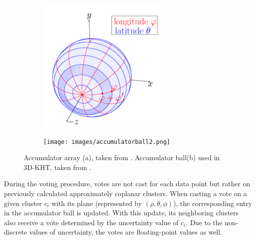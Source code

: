\documentclass[main.tex]{subfiles}
\begin{document}
\begin{figure}[H]
    \centering
    \hspace{\fill}
    \begin{subfigure}{0.4\textwidth}
        \centering
        \includegraphics[width=\textwidth]{images/accumulatorarray.png}
        \caption[3D-KHT Accumulator Ball]{}
        \label{fig:accarr}
    \end{subfigure}
    \hspace{\fill}
    \begin{subfigure}{0.4\textwidth}
        \centering
        \texttt{[image: images/accumulatorball2.png]}
        \caption[3D-KHT Accumulator Ball]{}
        \label{fig:accball}
    \end{subfigure}
    \hspace{\fill}
    \caption[Hough Transform Accumulators]{Accumulator array (a), taken from \cite*[Figure~3]{Borrmann_Elseberg_Lingemann_Nüchter_2011}. Accumulator 
    ball(b) used in 3D-KHT, taken from \cite*[Figure~5]{Limberger_Oliveira_2015}.}
\end{figure}

During the voting procedure, votes are not cast for each data point but rather on previously calculated approximately coplanar clusters.
When casting a vote on a given cluster $c_i$ with its plane (represented by $(\rho, \theta, \phi)$), the corresponding entry in the accumulator ball is updated.
With this update, its neighboring clusters also receive a vote determined by the uncertainty value of $c_i$. Due to the non-discrete 
values of uncertainty, the votes are floating-point values as well.
\end{document}
